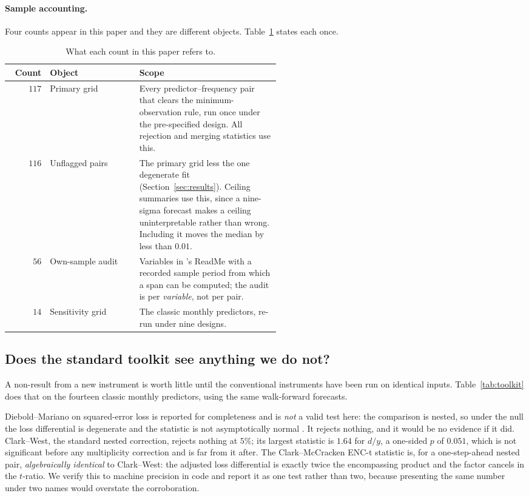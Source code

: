 \documentclass{article}
\theoremstyle{plain}
\theoremstyle{definition}
\begin{document}
\paragraph{Sample accounting.} Four counts appear in this paper and they are different objects.
Table~\ref{tab:accounting} states each once.

\begin{table}[t]
  \centering
  \caption{What each count in this paper refers to.}
  \label{tab:accounting}
  \small
  \begin{tabular}{rlp{0.52\linewidth}}
    \toprule
    Count & Object & Scope \\
    \midrule
    $117$ & Primary grid & Every predictor--frequency pair that clears the minimum-observation
    rule, run once under the pre-specified design. All rejection and merging statistics use
    this. \\
    $116$ & Unflagged pairs & The primary grid less the one degenerate fit
    (Section~\ref{sec:results}). Ceiling summaries use this, since a nine-sigma forecast makes a
    ceiling uninterpretable rather than wrong. Including it moves the median by less than
    $0.01$. \\
    $56$  & Own-sample audit & Variables in \citeauthor{goyal2024}'s ReadMe with a recorded
    sample period from which a span can be computed; the audit is per \emph{variable}, not per
    pair. \\
    $14$  & Sensitivity grid & The classic monthly predictors, re-run under nine designs. \\
    \bottomrule
  \end{tabular}
\end{table}

\subsection{Does the standard toolkit see anything we do not?}
\label{sec:toolkit}

A non-result from a new instrument is worth little until the conventional instruments have been
run on identical inputs. Table~\ref{tab:toolkit} does that on the fourteen classic monthly
predictors, using the same walk-forward forecasts.

Diebold--Mariano on squared-error loss is reported for completeness and is \emph{not} a valid
test here: the comparison is nested, so under the null the loss differential is degenerate and
the statistic is not asymptotically normal \citep{clark2001}. It rejects nothing, and it would
be no evidence if it did. Clark--West, the standard nested correction, rejects nothing at $5\%$;
its largest statistic is $1.64$ for $d/y$, a one-sided $p$ of $0.051$, which is not significant
before any multiplicity correction and is far from it after. The Clark--McCracken ENC-t
statistic is, for a one-step-ahead nested pair, \emph{algebraically identical} to Clark--West:
the adjusted loss differential is exactly twice the encompassing product and the factor cancels
in the $t$-ratio. We verify this to machine precision in code and report it as one test rather
than two, because presenting the same number under two names would overstate the corroboration.
\end{document}
